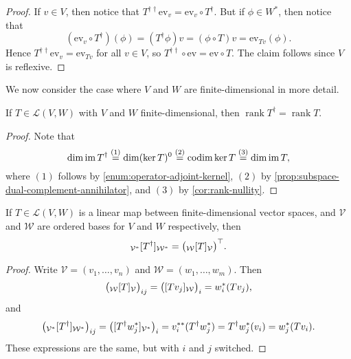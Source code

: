 \documentclass[a4paper, 11pt]{memoir}
\newcommand{\ev}{\mathrm{ev}}
\theoremstyle{plaincustomnumber}
\theoremstyle{changedotbreakcustomnumber}
\newcommand{\calL}{\mathcal{L}}
\newcommand{\calV}{\mathcal{V}}
\newcommand{\calW}{\mathcal{W}}
\newcommand{\trans}{^{\top}}
\newcommand{\im}{\operatorname{im}}
\begin{document}
\begin{proof}
    If $v \in V$, then notice that $T^{\dagger\dagger} \ev_v = \ev_v \circ T^\dagger$. But if $\phi \in W^*$, then notice that
    \begin{equation*}
        (\ev_v \circ T^\dagger)(\phi)
            = (T^\dagger\phi)v
            = (\phi \circ T)v
            = \ev_{Tv}(\phi).
    \end{equation*}
    Hence $T^{\dagger\dagger} \ev_v = \ev_{Tv}$ for all $v \in V$, so $T^{\dagger\dagger} \circ \ev = \ev \circ T$. The claim follows since $V$ is reflexive.
\end{proof}



\newpar

We now consider the case where $V$ and $W$ are finite-dimensional in more detail.

\newcommand{\rank}{\operatorname{rank}}

\begin{corollary}
    \label{cor:adjoint-rank}
    If $T \in \calL(V,W)$ with $V$ and $W$ finite-dimensional, then $\rank T^\dagger = \rank T$.
\end{corollary}

\begin{proof}
    Note that
    \begin{equation*}
        \dim \im T^\dagger
            \overset{(1)}{=} \dim (\ker T)^0
            \overset{(2)}{=} \codim \ker T
            \overset{(3)}{=} \dim \im T,
    \end{equation*}
    where $(1)$ follows by \cref{enum:operator-adjoint-kernel}, $(2)$ by \cref{prop:subspace-dual-complement-annihilator}, and $(3)$ by \cref{cor:rank-nullity}.
\end{proof}


\begin{proposition}
    \label{prop:adjoint-mr}
    If $T \in \calL(V,W)$ is a linear map between finite-dimensional vector spaces, and $\calV$ and $\calW$ are ordered bases for $V$ and $W$ respectively, then
    \begin{equation*}
        \mr{\calV^*}{T^\dagger}{\calW^*}
            = \bigl( \mr{\calW}{T}{\calV} \bigr)\trans.
    \end{equation*}
\end{proposition}

\begin{proof}
    Write $\calV = (v_1, \ldots, v_n)$ and $\calW = (w_1, \ldots, w_m)$. Then
    \begin{equation*}
        \bigl( \mr{\calW}{T}{\calV} \bigr)_{ij}
            = \bigl( \coordvec{Tv_j}{\calW} \bigr)_i
            = w_i^*(Tv_j),
    \end{equation*}
    and
    \begin{equation*}
        \bigl( \mr{\calV^*}{T^\dagger}{\calW^*} \bigr)_{ij}
            = \bigl( \coordvec{T^\dagger w_j^*}{\calV^*} \bigr)_i
            = v_i^{**}(T^\dagger w_j^*)
            = T^\dagger w_j^*(v_i)
            = w_j^*(Tv_i).
    \end{equation*}
    These expressions are the same, but with $i$ and $j$ switched.
\end{proof}
\end{document}
